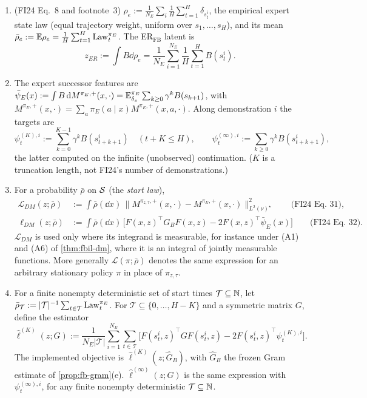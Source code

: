 \begin{definition}\label{def:fbil}
\leavevmode
\begin{enumerate}[nosep,label=(\alph*)]
\item (FI24 Eq.~8 and footnote~3) $\rho_e:=\frac1{N_E}\sum_i\frac1H\sum_{t=1}^H\delta_{s^i_t}$, the empirical expert state law (equal trajectory weight, uniform over $s_1,\dots,s_H$), and its mean $\bar\rho_e:=\mathbb{E}\rho_e=\frac1H\sum_{t=1}^H\mathrm{Law}^{\pi_E}_t$.
  The ER$_{\mathrm{FB}}$ latent is
  \begin{equation}\label{eq:fbil-zer}
  z_{ER}:=\int B\dd\rho_e=\frac1{N_E}\sum_{i=1}^{N_E}\frac1H\sum_{t=1}^HB(s^i_t).
  \end{equation}
\item The expert successor features are $\bar\psi_E(x):=\int B\,\mathrm{d} M^{\pi_E,+}(x,\cdot)=\mathbb{E}^{\pi_E}_{\delta_x}\sum_{k\ge0}\gamma^kB(s_{k+1})$, with $M^{\pi_E,+}(x,\cdot)=\sum_a\pi_E(a\mid x)M^{\pi_E,+}(x,a,\cdot)$.
  Along demonstration $i$ the targets are
  \begin{equation}\label{eq:fbil-psi}
  \psi^{(K),i}_t:=\sum_{k=0}^{K-1}\gamma^kB(s^i_{t+k+1})\quad(t+K\le H),\qquad\psi^{(\infty),i}_t:=\sum_{k\ge0}\gamma^kB(s^i_{t+k+1}),
  \end{equation}
  the latter computed on the infinite (unobserved) continuation. ($K$ is a truncation length, not FI24's number of demonstrations.)
\item For a probability $\bar\rho$ on $\mathcal{S}$ (the \emph{start law}),
  \begin{align}
  \mathcal L_{DM}(z;\bar\rho)&:=\int\bar\rho(\dd x)\,\|M^{\pi_{z,\tau},+}(x,\cdot)-M^{\pi_E,+}(x,\cdot)\|^2_{L^2(\nu)^\star}\qquad\text{(FI24 Eq.~31)},\label{eq:fbil-LDM}\\
  \ell_{DM}(z;\bar\rho)&:=\int\bar\rho(\dd x)\,\big[F(x,z)^\top G_BF(x,z)-2F(x,z)^\top\bar\psi_E(x)\big]\qquad\text{(FI24 Eq.~32)}.\label{eq:fbil-lDM}
  \end{align}
  $\mathcal L_{DM}$ is used only where its integrand is measurable, for instance under (A1) and (A6) of \cref{thm:fbil-dm}, where it is an integral of jointly measurable functions.
  More generally $\mathcal L(\pi;\bar\rho)$ denotes the same expression for an arbitrary stationary policy $\pi$ in place of $\pi_{z,\tau}$.
\item For a finite nonempty deterministic set of start times $\mathcal T\subseteq\mathbb{N}$, let $\bar\rho_{\mathcal T}:=|\mathcal T|^{-1}\sum_{t\in\mathcal T}\mathrm{Law}^{\pi_E}_t$. For $\mathcal T\subseteq\{0,\dots,H-K\}$ and a symmetric matrix $G$, define the estimator
  \begin{equation}\label{eq:fbil-est}
  \hat\ell^{(K)}(z;G):=\frac1{N_E|\mathcal T|}\sum_{i=1}^{N_E}\sum_{t\in\mathcal T}\Big[F(s^i_t,z)^\top GF(s^i_t,z)-2F(s^i_t,z)^\top\psi^{(K),i}_t\Big].
  \end{equation}
  The implemented objective is $\hat\ell^{(K)}(z;\hat G_B)$, with $\hat G_B$ the frozen Gram estimate of \cref{prop:fb-gram}(e). $\hat\ell^{(\infty)}(z;G)$ is the same expression with $\psi^{(\infty),i}_t$, for any finite nonempty deterministic $\mathcal T\subseteq\mathbb{N}$.
\end{enumerate}
\end{definition}

